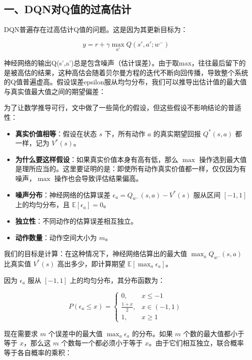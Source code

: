 \hypertarget{ux4e00dqnux5bf9qux503cux7684ux8fc7ux9ad8ux4f30ux8ba1}{%
\subsection{一、DQN对Q值的过高估计}\label{ux4e00dqnux5bf9qux503cux7684ux8fc7ux9ad8ux4f30ux8ba1}}

DQN普遍存在过高估计Q值的问题。这是因为其更新目标为：

\[
y=r+\gamma\max_{a'}Q(s',a';w^{-})
\]

神经网络的输出Q(s',a')总是包含噪声（估计误差）。由于取max，往往最后留下的是被高估的结果，这种高估会随着贝尔曼方程的迭代不断向回传播，导致整个系统的Q值普遍虚高。假设误差epsilon服从均匀分布，我们可以推导出估计值的最大值与真实值最大值之间的期望偏差：

为了让数学推导可行，文中做了一些简化的假设，但这些假设不影响结论的普适性：

\begin{itemize}
\tightlist
\item
  \textbf{真实价值相等}：假设在状态 \(s\) 下，所有动作 \(a\) 的真实期望回报 \(Q^{*}(s,a)\) 都一样，记为 \(V^{*}(s)\)。
\item
  \textbf{为什么要这样假设}：如果真实价值本身有高有低，那么 \(\max\) 操作选到最大值是理所应当的。这里要证明的是：即使所有动作真实价值都一样，仅仅因为有噪声，\(\max\) 操作也会导致评估结果偏高。
\item
  \textbf{噪声分布}：神经网络的估算误差 \(\epsilon_a=Q_{w^{-}}(s,a)-V^{*}(s)\) 服从区间 \([-1,1]\) 上的均匀分布，且 \(\mathbb{E}[\epsilon_a]=0\)。
\item
  \textbf{独立性}：不同动作的估算误差相互独立。
\item
  \textbf{动作数量}：动作空间大小为 \(m\)。
\end{itemize}

我们的目标是计算：在这种情况下，神经网络估算出的最大值 \(\max_a Q_{w^{-}}(s,a)\) 比真实值 \(V^{*}(s)\) 高出多少，即计算期望 \(\mathbb{E}[\max_a\epsilon_a]\)。

因为 \(\epsilon_a\) 服从 \([-1,1]\) 上的均匀分布，其分布函数为：

\[
P(\epsilon_a\le x)=
\begin{cases}
0, & x\le -1\\
\frac{1+x}{2}, & x\in(-1,1)\\
1, & x\ge 1
\end{cases}
\]

现在需要求 \(m\) 个误差中的最大值 \(\max_a\epsilon_a\) 的分布。如果 \(m\) 个数的最大值都小于等于 \(x\)，那么这 \(m\) 个数每一个都必须小于等于 \(x\)。由于它们相互独立，联合概率等于各自概率的乘积：

